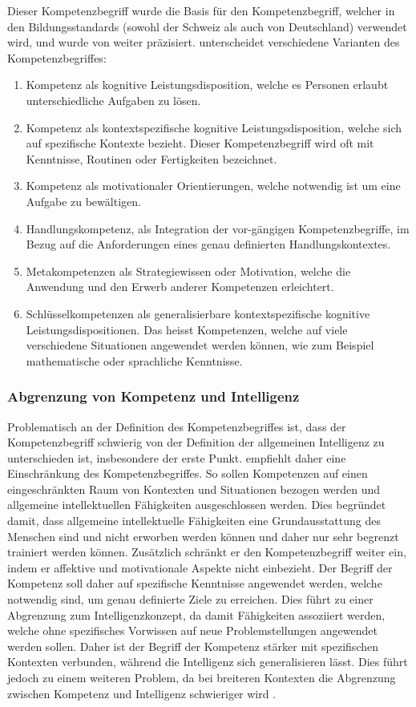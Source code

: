 Dieser Kompetenzbegriff wurde die Basis für den Kompetenzbegriff, welcher in den Bildungsstandards (sowohl der Schweiz als auch von Deutschland) verwendet wird, und wurde von \citet{Klieme2004} weiter präzisiert.
\citet{Klieme2004} unterscheidet verschiedene Varianten des Kompetenzbegriffes: 
\begin{enumerate}
\item Kompetenz als kognitive Leistungsdisposition, welche es Personen erlaubt unterschiedliche Aufgaben zu lösen.
\item Kompetenz als kontextspezifische kognitive Leistungsdisposition, welche sich auf spezifische Kontexte bezieht. Dieser Kompetenzbegriff wird oft mit Kenntnisse, Routinen oder Fertigkeiten bezeichnet.
\item Kompetenz als motivationaler Orientierungen, welche notwendig ist um eine Aufgabe zu bewältigen.
\item Handlungskompetenz, als Integration der vor-gängigen Kompetenzbegriffe, im Bezug auf die Anforderungen eines genau definierten Handlungskontextes.
\item Metakompetenzen als Strategiewissen oder Motivation, welche die Anwendung und den Erwerb anderer Kompetenzen erleichtert.
\item Schlüsselkompetenzen als generalisierbare kontextspezifische kognitive Leistungsdispositionen. Das heisst Kompetenzen, welche auf viele verschiedene Situationen angewendet werden können, wie zum Beispiel mathematische oder sprachliche Kenntnisse.
\end{enumerate}




\subsubsection*{Abgrenzung von Kompetenz und Intelligenz}
Problematisch an der Definition des Kompetenzbegriffes ist, dass der Kompetenzbegriff schwierig von der Definition der allgemeinen Intelligenz zu unterschieden ist, insbesondere der erste Punkt. \citet{Weinert2001b} empfiehlt daher eine Einschränkung des Kompetenzbegriffes. So sollen Kompetenzen auf einen eingeschränkten Raum von Kontexten und Situationen bezogen werden und allgemeine intellektuellen Fähigkeiten ausgeschlossen werden. Dies begründet \citet{Weinert2001b} damit, dass allgemeine intellektuelle Fähigkeiten eine Grundausstattung des Menschen sind und nicht erworben werden können und daher nur sehr begrenzt trainiert werden können. Zusätzlich schränkt er den Kompetenzbegriff weiter ein, indem er affektive und motivationale Aspekte nicht einbezieht. Der Begriff der Kompetenz soll daher auf spezifische Kenntnisse angewendet werden, welche notwendig sind, um genau definierte Ziele zu erreichen. Dies führt zu einer Abgrenzung zum Intelligenzkonzept, da damit Fähigkeiten assoziiert werden, welche ohne spezifisches Vorwissen auf neue Problemstellungen angewendet werden sollen. Daher ist der Begriff der Kompetenz stärker mit spezifischen Kontexten verbunden, während die Intelligenz sich generalisieren lässt. Dies führt jedoch zu einem weiteren Problem, da bei breiteren Kontexten die Abgrenzung zwischen Kompetenz und Intelligenz schwieriger wird \citep{Hartig2006}.



